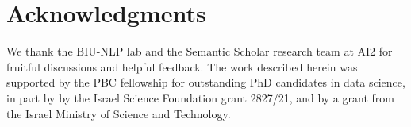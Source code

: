 \section*{Acknowledgments}
We thank the BIU-NLP lab and the Semantic Scholar research team at AI2 for fruitful discussions and helpful feedback.
The work described herein was supported by the PBC fellowship for outstanding PhD candidates in data science, in part by by the Israel Science Foundation grant 2827/21, and by a grant from the Israel Ministry of Science and Technology.
